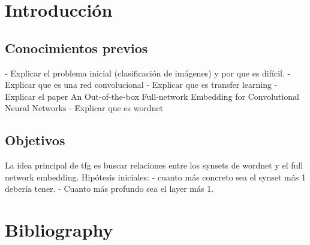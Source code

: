 \documentclass[12,twoside]{TFG-GM}
\theoremstyle{definition}
\theoremstyle{remark}
\begin{document}
\maketitle

\section{Introducción}

\subsection{Conocimientos previos}
- Explicar el problema inicial (clasificación de imágenes) y por que es difícil.
- Explicar que es una red convolucional 
- Explicar que es transfer learning 
- Explicar el paper An Out-of-the-box Full-network Embedding for
Convolutional Neural Networks
- Explicar que es wordnet

\subsection{Objetivos}
La idea principal de tfg es buscar relaciones entre los synsets de wordnet y el full network embedding. 
Hipótesis iniciales: 
- cuanto más concreto sea el synset más 1 debería tener.
- Cuanto más profundo sea el layer más 1.
\section{Bibliography}
\end{document}
